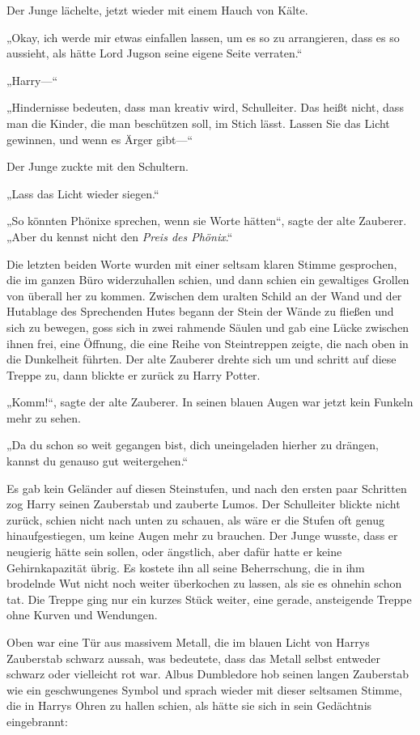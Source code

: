 {Der Junge lächelte, jetzt wieder mit einem Hauch von Kälte.

„Okay, ich werde mir etwas einfallen lassen, um es so zu arrangieren, dass es so aussieht, als hätte Lord Jugson seine eigene Seite verraten.“

„Harry—“

„Hindernisse bedeuten, dass man kreativ wird, Schulleiter. Das heißt nicht, dass man die Kinder, die man beschützen soll, im Stich lässt. Lassen Sie das Licht gewinnen, und wenn es Ärger gibt—“

Der Junge zuckte mit den Schultern.

„Lass das Licht wieder siegen.“

„So könnten Phönixe sprechen, wenn sie Worte hätten“, sagte der alte Zauberer. „Aber du kennst nicht den \emph{Preis des Phönix}.“

Die letzten beiden Worte wurden mit einer seltsam klaren Stimme gesprochen, die im ganzen Büro widerzuhallen schien, und dann schien ein gewaltiges Grollen von überall her zu kommen. Zwischen dem uralten Schild an der Wand und der Hutablage des Sprechenden Hutes begann der Stein der Wände zu fließen und sich zu bewegen, goss sich in zwei rahmende Säulen und gab eine Lücke zwischen ihnen frei, eine Öffnung, die eine Reihe von Steintreppen zeigte, die nach oben in die Dunkelheit führten. Der alte Zauberer drehte sich um und schritt auf diese Treppe zu, dann blickte er zurück zu Harry Potter.

„Komm!“, sagte der alte Zauberer. In seinen blauen Augen war jetzt kein Funkeln mehr zu sehen.

„Da du schon so weit gegangen bist, dich uneingeladen hierher zu drängen, kannst du genauso gut weitergehen.“

Es gab kein Geländer auf diesen Steinstufen, und nach den ersten paar Schritten zog Harry seinen Zauberstab und zauberte Lumos. Der Schulleiter blickte nicht zurück, schien nicht nach unten zu schauen, als wäre er die Stufen oft genug hinaufgestiegen, um keine Augen mehr zu brauchen. Der Junge wusste, dass er neugierig hätte sein sollen, oder ängstlich, aber dafür hatte er keine Gehirnkapazität übrig. Es kostete ihn all seine Beherrschung, die in ihm brodelnde Wut nicht noch weiter überkochen zu lassen, als sie es ohnehin schon tat. Die Treppe ging nur ein kurzes Stück weiter, eine gerade, ansteigende Treppe ohne Kurven und Wendungen.

Oben war eine Tür aus massivem Metall, die im blauen Licht von Harrys Zauberstab schwarz aussah, was bedeutete, dass das Metall selbst entweder schwarz oder vielleicht rot war. Albus Dumbledore hob seinen langen Zauberstab wie ein geschwungenes Symbol und sprach wieder mit dieser seltsamen Stimme, die in Harrys Ohren zu hallen schien, als hätte sie sich in sein Gedächtnis eingebrannt:

}
